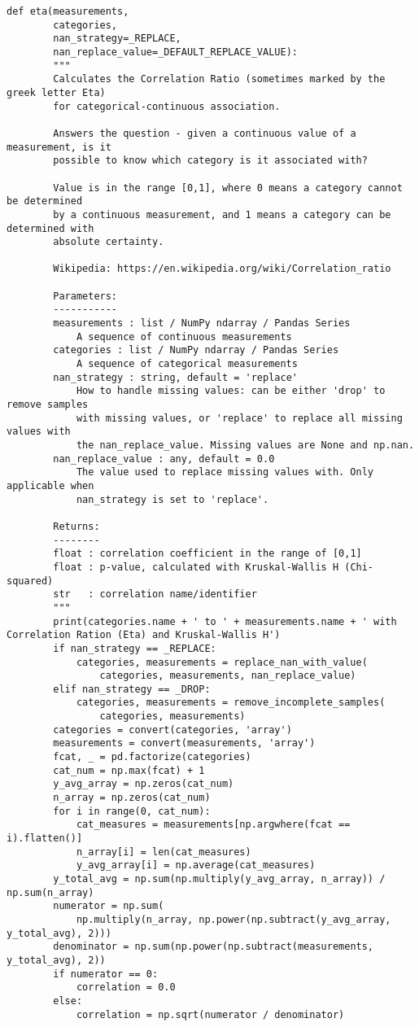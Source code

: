 \begin{lstlisting}[basicstyle=\tiny, style=py, caption={Compute Correlation Function}, label=lst:compute_correlation]
    def eta(measurements,
        categories,
        nan_strategy=_REPLACE,
        nan_replace_value=_DEFAULT_REPLACE_VALUE):
        """
        Calculates the Correlation Ratio (sometimes marked by the greek letter Eta)
        for categorical-continuous association.

        Answers the question - given a continuous value of a measurement, is it
        possible to know which category is it associated with?

        Value is in the range [0,1], where 0 means a category cannot be determined
        by a continuous measurement, and 1 means a category can be determined with
        absolute certainty.

        Wikipedia: https://en.wikipedia.org/wiki/Correlation_ratio

        Parameters:
        -----------
        measurements : list / NumPy ndarray / Pandas Series
            A sequence of continuous measurements
        categories : list / NumPy ndarray / Pandas Series
            A sequence of categorical measurements
        nan_strategy : string, default = 'replace'
            How to handle missing values: can be either 'drop' to remove samples
            with missing values, or 'replace' to replace all missing values with
            the nan_replace_value. Missing values are None and np.nan.
        nan_replace_value : any, default = 0.0
            The value used to replace missing values with. Only applicable when
            nan_strategy is set to 'replace'.

        Returns:
        --------
        float : correlation coefficient in the range of [0,1]
        float : p-value, calculated with Kruskal-Wallis H (Chi-squared)
        str   : correlation name/identifier
        """
        print(categories.name + ' to ' + measurements.name + ' with Correlation Ration (Eta) and Kruskal-Wallis H')
        if nan_strategy == _REPLACE:
            categories, measurements = replace_nan_with_value(
                categories, measurements, nan_replace_value)
        elif nan_strategy == _DROP:
            categories, measurements = remove_incomplete_samples(
                categories, measurements)
        categories = convert(categories, 'array')
        measurements = convert(measurements, 'array')
        fcat, _ = pd.factorize(categories)
        cat_num = np.max(fcat) + 1
        y_avg_array = np.zeros(cat_num)
        n_array = np.zeros(cat_num)
        for i in range(0, cat_num):
            cat_measures = measurements[np.argwhere(fcat == i).flatten()]
            n_array[i] = len(cat_measures)
            y_avg_array[i] = np.average(cat_measures)
        y_total_avg = np.sum(np.multiply(y_avg_array, n_array)) / np.sum(n_array)
        numerator = np.sum(
            np.multiply(n_array, np.power(np.subtract(y_avg_array, y_total_avg), 2)))
        denominator = np.sum(np.power(np.subtract(measurements, y_total_avg), 2))
        if numerator == 0:
            correlation = 0.0
        else:
            correlation = np.sqrt(numerator / denominator)


\end{lstlisting}
